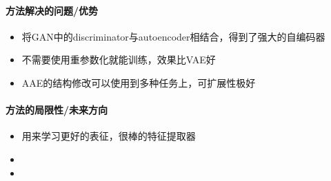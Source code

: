 \paragraph{方法解决的问题/优势}
\begin{itemize}
	\item 将GAN中的discriminator与autoencoder相结合，得到了强大的自编码器
	\item 不需要使用重参数化就能训练，效果比VAE好
	\item AAE的结构修改可以使用到多种任务上，可扩展性极好
\end{itemize}

\paragraph{方法的局限性/未来方向}
\begin{itemize}
	\item 用来学习更好的表征，很棒的特征提取器
	\item {}
	\item {}
\end{itemize}